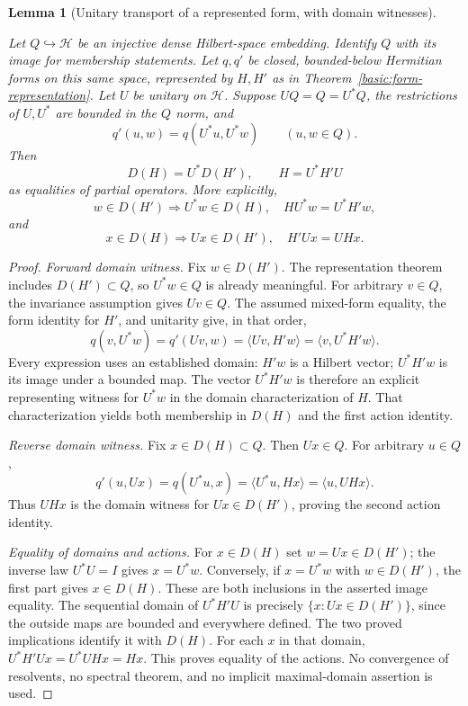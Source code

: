 \documentclass[11pt,a4paper]{article}
\newtheorem{lemma}[theorem]{Lemma}
\theoremstyle{definition}
\theoremstyle{remark}
\newcommand{\proofid}[1]{\par\smallskip{\normalfont\scriptsize\color{inkblue}Stable ID: \nolinkurl{#1}}\par\smallskip}
\begin{document}
\begin{lemma}[Unitary transport of a represented form, with domain witnesses]
\label{basic:unitary-form-transport}
\proofid{basic:unitary-form-transport}
\par{}\par\smallskip

Let $Q\hookrightarrow\mathcal H$ be an injective dense Hilbert-space
embedding. Identify $Q$ with its image for membership statements.
Let $q,q'$ be closed, bounded-below Hermitian forms on this same
space, represented by $H,H'$ as in
Theorem~\ref{basic:form-representation}. Let $U$ be unitary on
$\mathcal H$. Suppose $UQ=Q=U^*Q$, the restrictions of $U,U^*$
are bounded in the $Q$ norm, and
\[
 q'(u,w)=q(U^*u,U^*w)\qquad(u,w\in Q).
\]
Then
\[
 D(H)=U^*D(H'),\qquad H=U^*H'U
\]
as equalities of partial operators. More explicitly,
\[
 w\in D(H')\Longrightarrow U^*w\in D(H),\quad
 HU^*w=U^*H'w,
\]
and
\[
 x\in D(H)\Longrightarrow Ux\in D(H'),\quad H'Ux=UHx.
\]
\end{lemma}
\begin{proof}
\emph{Forward domain witness.}
Fix $w\in D(H')$. The representation theorem includes
$D(H')\subset Q$, so $U^*w\in Q$ is already meaningful.
For arbitrary $v\in Q$, the invariance assumption gives $Uv\in Q$.
The assumed mixed-form equality, the form identity for $H'$, and
unitarity give, in that order,
\[
 q(v,U^*w)=q'(Uv,w)=\langle Uv,H'w\rangle
                       =\langle v,U^*H'w\rangle.
\]
Every expression uses an established domain: $H'w$ is a Hilbert
vector; $U^*H'w$ is its image under a bounded map. The vector
$U^*H'w$ is therefore an explicit representing witness for
$U^*w$ in the domain characterization of $H$. That characterization
yields both membership in $D(H)$ and the first action identity.

\emph{Reverse domain witness.}
Fix $x\in D(H)\subset Q$. Then $Ux\in Q$. For arbitrary $u\in Q$,
\[
 q'(u,Ux)=q(U^*u,x)=\langle U^*u,Hx\rangle
                         =\langle u,UHx\rangle.
\]
Thus $UHx$ is the domain witness for $Ux\in D(H')$, proving
the second action identity.

\emph{Equality of domains and actions.}
For $x\in D(H)$ set $w=Ux\in D(H')$; the inverse law
$U^*U=I$ gives $x=U^*w$. Conversely, if $x=U^*w$ with
$w\in D(H')$, the first part gives $x\in D(H)$.
These are both inclusions in the asserted image equality. The
sequential domain of $U^*H'U$ is precisely
$\{x:Ux\in D(H')\}$, since the outside maps are bounded and
everywhere defined. The two proved implications identify it with
$D(H)$. For each $x$ in that domain,
$U^*H'Ux=U^*UHx=Hx$. This proves equality of the actions.
No convergence of resolvents, no spectral theorem, and no implicit
maximal-domain assertion is used.
\end{proof}
\end{document}
